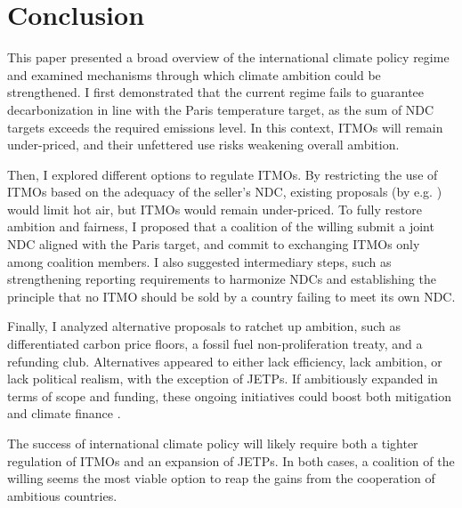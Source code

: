 \documentclass[12pt,english]{article}
\begin{document}

\section{Conclusion\label{sec:conclusion}}

This paper presented a broad overview of the international climate policy regime and examined mechanisms through which climate ambition could be strengthened. I first demonstrated that the current regime fails to guarantee decarbonization in line with the Paris temperature target, as the sum of NDC targets exceeds the required emissions level. In this context, ITMOs will remain under-priced, and their unfettered use risks weakening overall ambition. 

Then, I explored different options to regulate ITMOs. %
By restricting the use of ITMOs based on the adequacy of the seller's NDC, existing proposals (by e.g. \citealp{michaelowa_additionality_2019}) would limit hot air, but 
ITMOs would remain under-priced. 
To fully restore ambition and fairness, I proposed that a coalition of the willing submit a joint NDC aligned with the Paris target, and commit to exchanging ITMOs only among coalition members. I also suggested intermediary steps, such as strengthening reporting requirements to harmonize NDCs and establishing the principle that no ITMO should be sold by a country failing to meet its own NDC.

Finally, I analyzed alternative proposals to ratchet up ambition, such as differentiated carbon price floors, a fossil fuel non-proliferation treaty, and  %
a refunding club. Alternatives appeared to either lack efficiency, lack ambition, or lack political realism, with the exception of JETPs. If ambitiously expanded in terms of scope and funding, these ongoing initiatives could boost both mitigation and climate finance \citep{steckel_climate_2017,bolton_cop29_2024,bolton_why_2025}. 

The success of international climate policy will likely require both a tighter regulation of ITMOs and an expansion of JETPs. In both cases, a coalition of the willing seems the most viable option to reap the gains from the cooperation of ambitious countries. %
\end{document}
